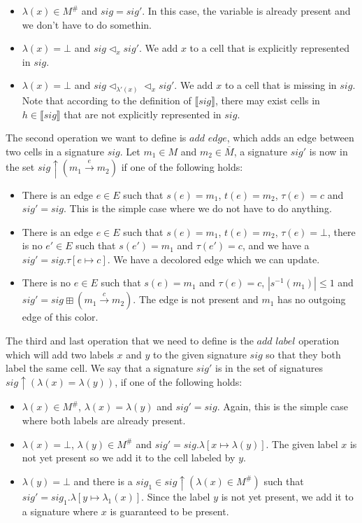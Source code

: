 \begin{itemize}
	\item $\lambda(x) \in M^{\#}$ and $sig = sig'$. In this case, the variable is already present and we don't have to do somethin.
	\item $\lambda(x) = \bot$ and $sig \vartriangleleft_x sig'$. We add $x$ to a cell that is explicitly represented in $sig$.
	\item $\lambda(x) = \bot$ and $sig \vartriangleleft_{\lambda'(x)} \vartriangleleft_x sig'$. We add $x$ to a cell that is missing in $sig$. Note that according to the definition of 
	$\llbracket sig \rrbracket$, there may exist cells in $h \in \llbracket sig \rrbracket$ that are not explicitly represented in $sig$.
\end{itemize}

The second operation we want to define is $add$ $edge$, which adds an edge between two cells in a signature $sig$. Let $m_1 \in M$ and $m_2 \in \overline{M}$, a signature $sig'$ is now in the set
$sig\uparrow(m_1 \xrightarrow{e} m_2)$ if one of the following holds:

\begin{itemize}
	\item There is an edge $e \in E$ such that $s(e) = m_1$, $t(e) = m_2$, $\tau(e) = c$ and $sig' = sig$. 
		This is the simple case where we do not have to do anything.
	\item There is an edge $e \in E$ such that $s(e) = m_1$, $t(e) = m_2$, $\tau(e) = \bot$, there is no $e' \in E$ such that
		$s(e') = m_1$ and $\tau(e') = c$, and we have a $sig' = sig.\tau [e \mapsto c]$. We have a decolored edge which we can update.
	\item There is no $e \in E$ such that $s(e) = m_1$ and $\tau(e) = c$, $|s^{-1}(m_1)| \le 1$ 
	and $sig' = sig \boxplus (m_1 \xrightarrow{c} m_2)$. The edge is not present and $m_1$ has no outgoing edge of this color.
\end{itemize}

\noindent
The third and last operation that we need to define is the $add$ $label$ operation which will add two labels $x$ and $y$ to the
given signature $sig$ so that they both label the same cell.
We say that a signature $sig'$ is in the set of signatures 
$sig\uparrow(\lambda(x) = \lambda(y))$, if one of the following
holds:

\begin{itemize}
	\item $\lambda(x) \in M^{\#}$, $\lambda(x) = \lambda(y)$ and $sig' = sig$. Again, this is the simple case where both labels are already present.
	\item $\lambda(x) = \bot$, $\lambda(y) \in M^{\#}$ and $sig' = sig.\lambda[x \mapsto \lambda(y)]$. The given label $x$ is not yet present so we add it to the cell labeled by $y$.
	\item $\lambda(y) = \bot$ and there is a $sig_1 \in sig\uparrow(\lambda(x) \in M^{\#})$ such that $sig' = sig_1.\lambda[y \mapsto \lambda_1(x)]$. Since the label $y$ is not yet present, we add it to a signature where $x$ is guaranteed to be present.
\end{itemize}

